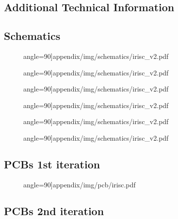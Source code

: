 \newpage
\begin{landscape}
\section{Additional Technical Information}\label{sec:appC}
\subsection{Schematics}

\begin{figure}[h!]
	 angle=90]{appendix/img/schematics/irisc_v2.pdf}
\end{figure}
\newpage
\begin{figure}[h!]
		 angle=90]{appendix/img/schematics/irisc_v2.pdf}
\end{figure}
\newpage
\begin{figure}[h!]
		 angle=90]{appendix/img/schematics/irisc_v2.pdf}
\end{figure}
\newpage
\begin{figure}[h!]
		 angle=90]{appendix/img/schematics/irisc_v2.pdf}
\end{figure}
\newpage
\begin{figure}[h!]
		 angle=90]{appendix/img/schematics/irisc_v2.pdf}
\end{figure}
\newpage
\begin{figure}[h!]
		 angle=90]{appendix/img/schematics/irisc_v2.pdf}
\end{figure}

\newpage
\subsection{PCBs 1st iteration}
\begin{figure}[h!]
		 angle=90]{appendix/img/pcb/irisc.pdf}
\end{figure}
\end{landscape}


\subsection{PCBs 2nd iteration}




